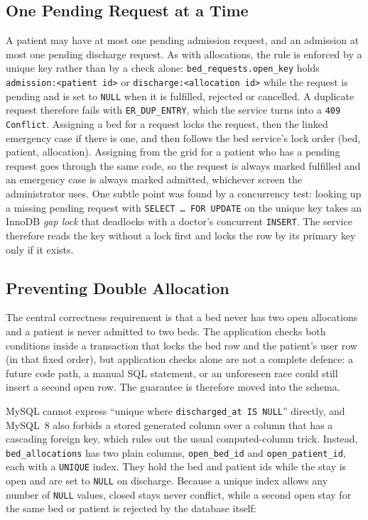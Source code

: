 \subsection{One Pending Request at a Time}

A patient may have at most one pending admission request, and an admission at most one pending discharge request. As with allocations, the rule is enforced by a unique key rather than by a check alone: \texttt{bed\_requests.open\_key} holds \texttt{admission:<patient id>} or \texttt{discharge:<allocation id>} while the request is pending and is set to \texttt{NULL} when it is fulfilled, rejected or cancelled. A duplicate request therefore fails with \texttt{ER\_DUP\_ENTRY}, which the service turns into a \texttt{409 Conflict}. Assigning a bed for a request locks the request, then the linked emergency case if there is one, and then follows the bed service's lock order (bed, patient, allocation). Assigning from the grid for a patient who has a pending request goes through the same code, so the request is always marked fulfilled and an emergency case is always marked admitted, whichever screen the administrator uses. One subtle point was found by a concurrency test: looking up a missing pending request with \texttt{SELECT \ldots{} FOR UPDATE} on the unique key takes an InnoDB \emph{gap lock} that deadlocks with a doctor's concurrent \texttt{INSERT}. The service therefore reads the key without a lock first and locks the row by its primary key only if it exists.

\subsection{Preventing Double Allocation}

The central correctness requirement is that a bed never has two open allocations and a patient is never admitted to two beds. The application checks both conditions inside a transaction that locks the bed row and the patient's user row (in that fixed order), but application checks alone are not a complete defence: a future code path, a manual SQL statement, or an unforeseen race could still insert a second open row. The guarantee is therefore moved into the schema.

MySQL cannot express ``unique where \texttt{discharged\_at IS NULL}'' directly, and MySQL~8 also forbids a stored generated column over a column that has a cascading foreign key, which rules out the usual computed-column trick. Instead, \texttt{bed\_allocations} has two plain columns, \texttt{open\_bed\_id} and \texttt{open\_patient\_id}, each with a \texttt{UNIQUE} index. They hold the bed and patient ids while the stay is open and are set to \texttt{NULL} on discharge. Because a unique index allows any number of \texttt{NULL} values, closed stays never conflict, while a second open stay for the same bed or patient is rejected by the database itself:

